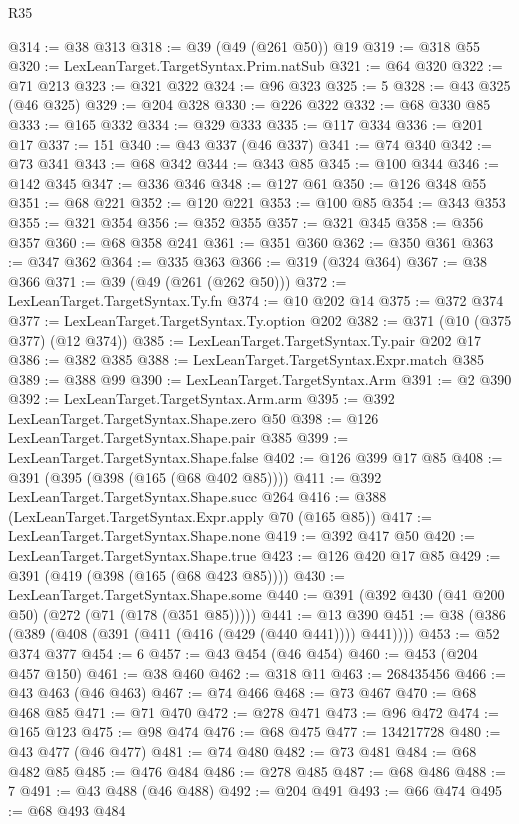 \begin{lexlean}{R35}
\begin{coremodule}
@314 := @38 @313
@318 := @39 (@49 (@261 @50)) @19
@319 := @318 @55
@320 := LexLeanTarget.TargetSyntax.Prim.natSub
@321 := @64 @320
@322 := @71 @213
@323 := @321 @322
@324 := @96 @323
@325 := 5
@328 := @43 @325 (@46 @325)
@329 := @204 @328
@330 := @226 @322
@332 := @68 @330 @85
@333 := @165 @332
@334 := @329 @333
@335 := @117 @334
@336 := @201 @17
@337 := 151
@340 := @43 @337 (@46 @337)
@341 := @74 @340
@342 := @73 @341
@343 := @68 @342
@344 := @343 @85
@345 := @100 @344
@346 := @142 @345
@347 := @336 @346
@348 := @127 @61
@350 := @126 @348 @55
@351 := @68 @221
@352 := @120 @221
@353 := @100 @85
@354 := @343 @353
@355 := @321 @354
@356 := @352 @355
@357 := @321 @345
@358 := @356 @357
@360 := @68 @358 @241
@361 := @351 @360
@362 := @350 @361
@363 := @347 @362
@364 := @335 @363
@366 := @319 (@324 @364)
@367 := @38 @366
@371 := @39 (@49 (@261 (@262 @50)))
@372 := LexLeanTarget.TargetSyntax.Ty.fn
@374 := @10 @202 @14
@375 := @372 @374
@377 := LexLeanTarget.TargetSyntax.Ty.option @202
@382 := @371 (@10 (@375 @377) (@12 @374))
@385 := LexLeanTarget.TargetSyntax.Ty.pair @202 @17
@386 := @382 @385
@388 := LexLeanTarget.TargetSyntax.Expr.match @385
@389 := @388 @99
@390 := LexLeanTarget.TargetSyntax.Arm
@391 := @2 @390
@392 := LexLeanTarget.TargetSyntax.Arm.arm
@395 := @392 LexLeanTarget.TargetSyntax.Shape.zero @50
@398 := @126 LexLeanTarget.TargetSyntax.Shape.pair @385
@399 := LexLeanTarget.TargetSyntax.Shape.false
@402 := @126 @399 @17 @85
@408 := @391 (@395 (@398 (@165 (@68 @402 @85))))
@411 := @392 LexLeanTarget.TargetSyntax.Shape.succ @264
@416 := @388 (LexLeanTarget.TargetSyntax.Expr.apply @70 (@165 @85))
@417 := LexLeanTarget.TargetSyntax.Shape.none
@419 := @392 @417 @50
@420 := LexLeanTarget.TargetSyntax.Shape.true
@423 := @126 @420 @17 @85
@429 := @391 (@419 (@398 (@165 (@68 @423 @85))))
@430 := LexLeanTarget.TargetSyntax.Shape.some
@440 := @391 (@392 @430 (@41 @200 @50) (@272 (@71 (@178 (@351 @85)))))
@441 := @13 @390
@451 := @38 (@386 (@389 (@408 (@391 (@411 (@416 (@429 (@440 @441)))) @441))))
@453 := @52 @374 @377
@454 := 6
@457 := @43 @454 (@46 @454)
@460 := @453 (@204 @457 @150)
@461 := @38 @460
@462 := @318 @11
@463 := 268435456
@466 := @43 @463 (@46 @463)
@467 := @74 @466
@468 := @73 @467
@470 := @68 @468 @85
@471 := @71 @470
@472 := @278 @471
@473 := @96 @472
@474 := @165 @123
@475 := @98 @474
@476 := @68 @475
@477 := 134217728
@480 := @43 @477 (@46 @477)
@481 := @74 @480
@482 := @73 @481
@484 := @68 @482 @85
@485 := @476 @484
@486 := @278 @485
@487 := @68 @486
@488 := 7
@491 := @43 @488 (@46 @488)
@492 := @204 @491
@493 := @66 @474
@495 := @68 @493 @484

\end{coremodule}
\end{lexlean}
